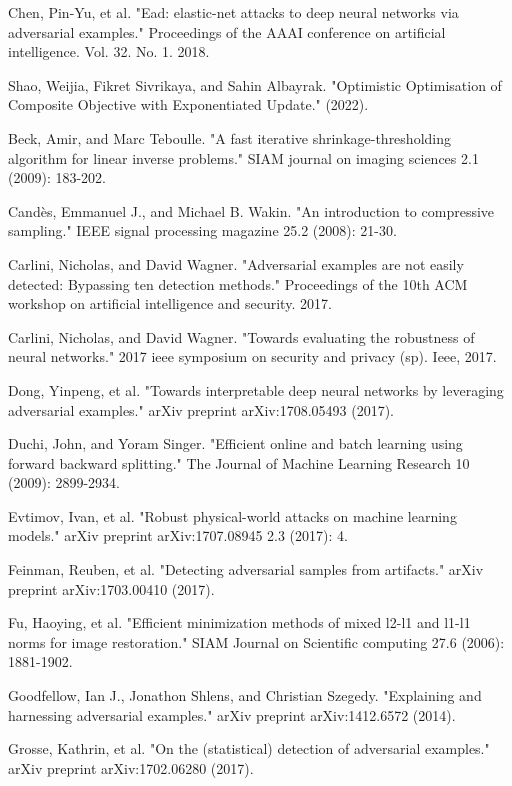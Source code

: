 \begin{thebibliography}{9}
	Chen, Pin-Yu, et al. "Ead: elastic-net attacks to deep neural networks via adversarial examples." Proceedings of the AAAI conference on artificial intelligence. Vol. 32. No. 1. 2018.

	\bibitem{}
	Shao, Weijia, Fikret Sivrikaya, and Sahin Albayrak. "Optimistic Optimisation of Composite Objective with Exponentiated Update." (2022).

	\bibitem{}
	Beck, Amir, and Marc Teboulle. "A fast iterative shrinkage-thresholding algorithm for linear inverse problems." SIAM journal on imaging sciences 2.1 (2009): 183-202.
	
	\bibitem{}
	Candès, Emmanuel J., and Michael B. Wakin. "An introduction to compressive sampling." IEEE signal processing magazine 25.2 (2008): 21-30.
	
	\bibitem{}
	Carlini, Nicholas, and David Wagner. "Adversarial examples are not easily detected: Bypassing ten detection methods." Proceedings of the 10th ACM workshop on artificial intelligence and security. 2017.
	
	\bibitem{}
	Carlini, Nicholas, and David Wagner. "Towards evaluating the robustness of neural networks." 2017 ieee symposium on security and privacy (sp). Ieee, 2017.
	
	\bibitem{}
	Dong, Yinpeng, et al. "Towards interpretable deep neural networks by leveraging adversarial examples." arXiv preprint arXiv:1708.05493 (2017).
	
	\bibitem{}
	Duchi, John, and Yoram Singer. "Efficient online and batch learning using forward backward splitting." The Journal of Machine Learning Research 10 (2009): 2899-2934.
	
	\bibitem{}
	Evtimov, Ivan, et al. "Robust physical-world attacks on machine learning models." arXiv preprint arXiv:1707.08945 2.3 (2017): 4.
	
	\bibitem{}
	Feinman, Reuben, et al. "Detecting adversarial samples from artifacts." arXiv preprint arXiv:1703.00410 (2017).
	
	\bibitem{}
	Fu, Haoying, et al. "Efficient minimization methods of mixed l2-l1 and l1-l1 norms for image restoration." SIAM Journal on Scientific computing 27.6 (2006): 1881-1902.
	
	\bibitem{}
	Goodfellow, Ian J., Jonathon Shlens, and Christian Szegedy. "Explaining and harnessing adversarial examples." arXiv preprint arXiv:1412.6572 (2014).
	
	\bibitem{}
	Grosse, Kathrin, et al. "On the (statistical) detection of adversarial examples." arXiv preprint arXiv:1702.06280 (2017).
	

\end{thebibliography}
